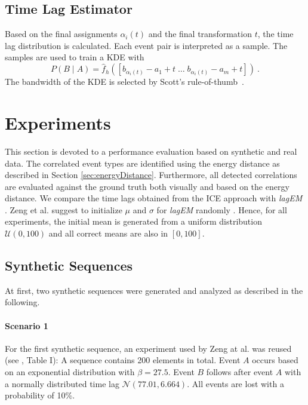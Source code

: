 \documentclass[conference]{IEEEtran}
\theoremstyle{examplestyle}
\begin{document}
\subsection{Time Lag Estimator} \label{sec:labestimator}
Based on the final assignments $\alpha_i(t)$ and the final transformation $t$, the time lag distribution is calculated. Each event pair is interpreted as a sample. The samples are used to train a \ac{KDE} with
\begin{equation}
	\label{eq:solutionICP}
	P(B \; | \; A) = \hat{f}_h \left(
		\left[
			b_{\alpha_i(t)} - a_1 + t \;
			\dots \;
			b_{\alpha_i(t)} - a_m + t
		\right] \right)~.
\end{equation}
The bandwidth of the \ac{KDE} is selected by Scott's rule-of-thumb~\cite{Scott1992}.












\section{Experiments} \label{sec:exp}

This section is devoted to a performance evaluation based on synthetic and real data. The correlated event types are identified using the energy distance as described in Section \ref{sec:energyDistance}. Furthermore, all detected correlations are evaluated against the  ground truth both visually and based on the energy distance.
We compare the time lags obtained from the  \ac{ICE} approach  with \textit{lagEM} \cite{Zeng2015}. %
Zeng et al. suggest to  initialize \(\mu\) and \(\sigma\) for  \textit{lagEM} randomly \cite{Zeng2015}. Hence, for all  experiments, the initial mean is generated from a uniform distribution \(\mathcal{U}(0, 100)\) and all correct means are also in \([0, 100]\).





\subsection{Synthetic Sequences}
At first,  two synthetic sequences  were generated and analyzed as described in the following.
\paragraph{Scenario 1}
For the first synthetic sequence, an experiment used by Zeng at al. was reused (see \cite{Zeng2015}, Table I): A sequence contains 200 elements in total. Event \(A\) occurs based on an exponential distribution with \(\beta = 27.5\). Event \(B\) follows after event \(A\) with a normally distributed time lag \(\mathcal{N}(77.01, 6.664)\). All events are lost with a probability of 10\%.
\end{document}
